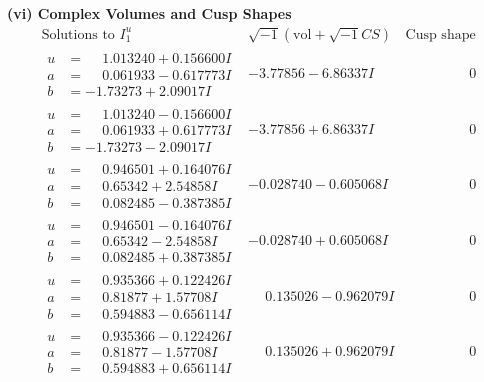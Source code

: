 \documentclass[1p]{elsarticle_modified}
\theoremstyle{definition}
\newcommand{\I}{\sqrt{-1}}
\begin{document}
\newpage\flushleft \textbf{(vi) Complex Volumes and Cusp Shapes}
$$\begin{array}{c|c|c}  
\text{Solutions to }I^u_{1}& \I (\text{vol} + \sqrt{-1}CS) & \text{Cusp shape}\\
 \hline 
\begin{aligned}
u &= \phantom{-}1.013240 + 0.156600 I \\
a &= \phantom{-}0.061933 - 0.617773 I \\
b &= -1.73273 + 2.09017 I\end{aligned}
 & -3.77856 - 6.86337 I & \phantom{-0.000000 } 0 \\ \hline\begin{aligned}
u &= \phantom{-}1.013240 - 0.156600 I \\
a &= \phantom{-}0.061933 + 0.617773 I \\
b &= -1.73273 - 2.09017 I\end{aligned}
 & -3.77856 + 6.86337 I & \phantom{-0.000000 } 0 \\ \hline\begin{aligned}
u &= \phantom{-}0.946501 + 0.164076 I \\
a &= \phantom{-}0.65342 + 2.54858 I \\
b &= \phantom{-}0.082485 - 0.387385 I\end{aligned}
 & -0.028740 - 0.605068 I & \phantom{-0.000000 } 0 \\ \hline\begin{aligned}
u &= \phantom{-}0.946501 - 0.164076 I \\
a &= \phantom{-}0.65342 - 2.54858 I \\
b &= \phantom{-}0.082485 + 0.387385 I\end{aligned}
 & -0.028740 + 0.605068 I & \phantom{-0.000000 } 0 \\ \hline\begin{aligned}
u &= \phantom{-}0.935366 + 0.122426 I \\
a &= \phantom{-}0.81877 + 1.57708 I \\
b &= \phantom{-}0.594883 - 0.656114 I\end{aligned}
 & \phantom{-}0.135026 - 0.962079 I & \phantom{-0.000000 } 0 \\ \hline\begin{aligned}
u &= \phantom{-}0.935366 - 0.122426 I \\
a &= \phantom{-}0.81877 - 1.57708 I \\
b &= \phantom{-}0.594883 + 0.656114 I\end{aligned}
 & \phantom{-}0.135026 + 0.962079 I & \phantom{-0.000000 } 0 \\ \hline\begin{aligned}

\end{aligned}
\end{array}$$
\end{document}
